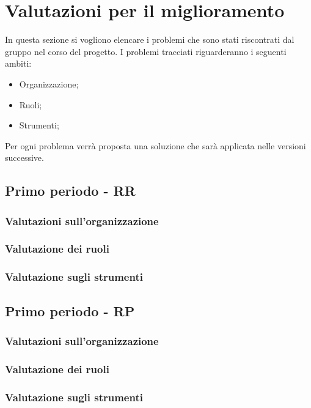 \section{Valutazioni per il miglioramento}
In questa sezione si vogliono elencare i problemi che sono stati riscontrati dal gruppo nel corso del progetto.
I problemi tracciati riguarderanno i seguenti ambiti:
\begin{itemize}
\item Organizzazione;
\item Ruoli;
\item Strumenti;
\end{itemize}
Per ogni problema verrà proposta una soluzione che sarà applicata nelle versioni successive.

\subsection{Primo periodo - RR}
\subsubsection{Valutazioni sull'organizzazione}
\subsubsection{Valutazione dei ruoli}
\subsubsection{Valutazione sugli strumenti}

\subsection{Primo periodo - RP}
\subsubsection{Valutazioni sull'organizzazione}
\subsubsection{Valutazione dei ruoli}
\subsubsection{Valutazione sugli strumenti}
